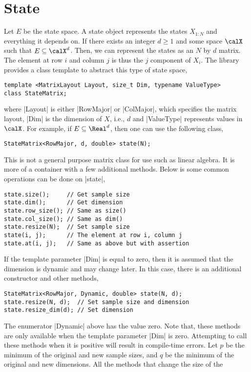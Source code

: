 \section{State}
\label{sec:State}

Let $E$ be the state space. A state object represents the states $X_{1:N}$ and
everything it depends on. If there exists an integer $d\ge1$ and some space
$\calX$ such that $E\subseteq\calX^d$. Then, we can represent the states as an
$N$ by $d$ matrix. The element at row $i$ and column $j$ is thus the $j$\ith
component of $X_i$. The library provides a class template to abstract this type
of state space,
\begin{verbatim}
template <MatrixLayout Layout, size_t Dim, typename ValueType>
class StateMatrix;
\end{verbatim}
where |Layout| is either |RowMajor| or |ColMajor|, which specifies the matrix
layout, |Dim| is the dimension of $X$, i.e., $d$ and |ValueType| represents
values in $\calX$. For example, if $E\subseteq\Real^d$, then one can use the
following class,
\begin{verbatim}
StateMatrix<RowMajor, d, double> state(N);
\end{verbatim}
This is not a general purpose matrix class for use such as linear algebra. It
is more of a container with a few additional methods. Below is some common
operations can be done on |state|,
\begin{verbatim}
state.size();     // Get sample size
state.dim();      // Get dimension
state.row_size(); // Same as size()
state.col_size(); // Same as dim()
state.resize(N);  // Set sample size
state(i, j);      // The element at row i, column j
state.at(i, j);   // Same as above but with assertion
\end{verbatim}
If the template parameter |Dim| is equal to zero, then it is assumed that the
dimension is dynamic and may change later. In this case, there is an additional
constructor and other methods,
\begin{verbatim}
StateMatrix<RowMajor, Dynamic, double> state(N, d);
state.resize(N, d);  // Set sample size and dimension
state.resize_dim(d); // Set dimension
\end{verbatim}
The enumerator |Dynamic| above has the value zero. Note that, these methods are
only available when the template parameter |Dim| is zero. Attempting to call
these methods when it is positive will result in compile-time errors. Let $p$
be the minimum of the original and new sample sizes, and $q$ be the minimum of
the original and new dimensions. All the methods that change the size of the
